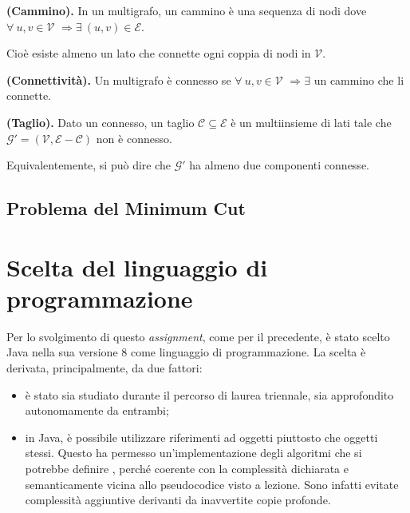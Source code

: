 \begin{defi} \textbf{(Cammino).} In un multigrafo, un cammino è una sequenza di nodi dove $\forall\ u,v\in\mathcal{V}$ $\Rightarrow\exists\ (u,v)\in\mathcal{E} $.
\end{defi}
Cioè esiste almeno un lato che connette ogni coppia di nodi in $\mathcal{V}$.
\begin{defi} \textbf{(Connettività).} Un multigrafo è connesso se $\forall\ u,v\in\mathcal{V}$ $\Rightarrow\exists$ un cammino che li connette.
\end{defi}
\begin{defi} \textbf{(Taglio).} Dato un \mgrafo connesso, un taglio $\mathcal{C}\subseteq\mathcal{E}$ è un multiinsieme di lati tale che $\mathcal{G}' = (\mathcal{V}, \mathcal{E} - \mathcal{C})$ non è connesso.
\end{defi}
Equivalentemente, si può dire che $\mathcal{G}'$ ha almeno due componenti connesse.
\newpage
\subsection{Problema del Minimum Cut}
\emph{}
 
\section{Scelta del linguaggio di programmazione}
Per lo svolgimento di questo \emph{assignment}, come per il precedente, è stato scelto Java nella sua versione 8 come linguaggio di programmazione. La scelta è derivata, principalmente, da due fattori: 
\begin{itemize}
	\item è stato sia studiato durante il percorso di laurea triennale, sia approfondito autonomamente da entrambi;
	\item in Java, è possibile utilizzare riferimenti ad oggetti piuttosto che oggetti stessi. Questo ha permesso un'implementazione degli algoritmi che si potrebbe definire , perché coerente con la complessità dichiarata e semanticamente vicina allo pseudocodice visto a lezione. Sono infatti evitate complessità aggiuntive derivanti da inavvertite copie profonde.
\end{itemize}

